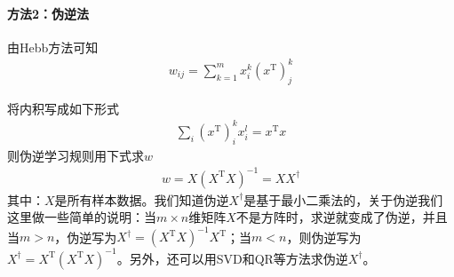 {            \paragraph{方法2：伪逆法}由Hebb方法可知
            \begin{align*}
            w_{ij} = \sum_{k=1}^mx_i^k(x^\mathrm{T})_j^k
            \end{align*}
            \par
            将内积写成如下形式
            \begin{align*}
            \sum_i (x^\mathrm{T})_i^k x_i^l = x^\mathrm{T}x
            \end{align*}
            则伪逆学习规则用下式求$w$
            \begin{align*}
            w = X(X^\mathrm{T}X)^{-1} = X X^{\dag}
            \end{align*}
            其中：$X$是所有样本数据。我们知道伪逆$X^\dag$是基于最小二乘法的，关于伪逆我们这里做一些简单的说明：当$m\times n$维矩阵$X$不是方阵时，求逆就变成了伪逆，并且当$m>n$，伪逆写为$X^\dag = (X^\mathrm{T}X)^{-1}X^\mathrm{T}$；当$m<n$，则伪逆写为$X^\dag = X^\mathrm{T}(X^\mathrm{T}X)^{-1}$。另外，还可以用SVD和QR等方法求伪逆$X^\dag$。
}
